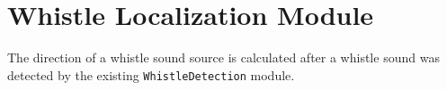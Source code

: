\section{Whistle Localization Module}
\label{sec:03_whistleLocalizationModule}

The direction of a whistle sound source is calculated after a whistle sound was detected
by the existing \lstinline!WhistleDetection! module.
